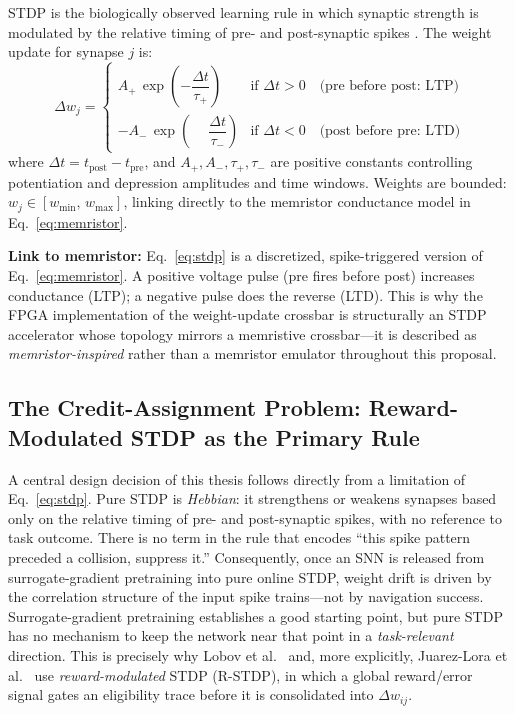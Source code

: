 \documentclass[11pt,a4paper]{article}
\begin{document}
STDP is the biologically observed learning rule in which synaptic strength is modulated
by the relative timing of pre- and post-synaptic spikes \cite{bi1998}. The weight
update for synapse $j$ is:
\begin{equation}
  \Delta w_j = \begin{cases}
    A_+\,\exp\!\left(-\dfrac{\Delta t}{\tau_+}\right) & \text{if } \Delta t > 0 \quad
      \text{(pre before post: LTP)} \\[8pt]
    -A_-\,\exp\!\left(\phantom{-}\dfrac{\Delta t}{\tau_-}\right) & \text{if } \Delta t < 0 \quad
      \text{(post before pre: LTD)}
  \end{cases}
  \label{eq:stdp}
\end{equation}
where $\Delta t = t_{\mathrm{post}} - t_{\mathrm{pre}}$, and $A_+, A_-, \tau_+, \tau_-$
are positive constants controlling potentiation and depression amplitudes and time
windows. Weights are bounded: $w_j \in [w_{\min},\, w_{\max}]$, linking directly to the
memristor conductance model in Eq.~\eqref{eq:memristor}.

\begin{notebox}
  \textbf{Link to memristor:} Eq.~\eqref{eq:stdp} is a discretized, spike-triggered
  version of Eq.~\eqref{eq:memristor}. A positive voltage pulse (pre fires before post)
  increases conductance (LTP); a negative pulse does the reverse (LTD). This is why the
  FPGA implementation of the weight-update crossbar is structurally an STDP
  accelerator whose topology mirrors a memristive crossbar---it is described as
  \emph{memristor-inspired} rather than a memristor emulator throughout this proposal.
\end{notebox}

\subsection{The Credit-Assignment Problem: Reward-Modulated STDP as the Primary Rule}
\label{sec:credit}

A central design decision of this thesis follows directly from a limitation of
Eq.~\eqref{eq:stdp}. Pure STDP is \emph{Hebbian}: it strengthens or weakens synapses
based only on the relative timing of pre- and post-synaptic spikes, with no reference
to task outcome. There is no term in the rule that encodes ``this spike pattern
preceded a collision, suppress it.'' Consequently, once an SNN is released from
surrogate-gradient pretraining into pure online STDP, weight drift is driven by the
correlation structure of the input spike trains---not by navigation success.
Surrogate-gradient pretraining establishes a good starting point, but pure STDP has no
mechanism to keep the network near that point in a \emph{task-relevant} direction. This
is precisely why Lobov et al.\ \cite{lobov2020} and, more explicitly, Juarez-Lora
et al.\ \cite{juarez2022} use \emph{reward-modulated} STDP (R-STDP), in which a global
reward/error signal gates an eligibility trace before it is consolidated into
$\Delta w_{ij}$.
\end{document}
